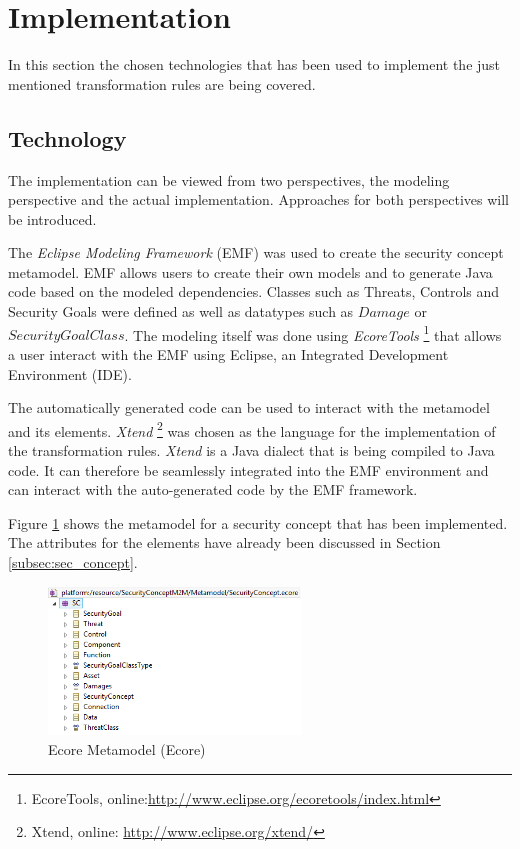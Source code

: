\section{Implementation}
\label{sec:implementation}

In this section the chosen technologies that has been used to implement the just mentioned transformation rules are being covered. 

\subsection{Technology}

The implementation can be viewed from two perspectives, the modeling perspective and the actual implementation. Approaches for both perspectives will be introduced.

The \textit{Eclipse Modeling Framework} (EMF) was used to create the security concept metamodel. EMF allows users to create their own models and to generate Java code based on the modeled dependencies. Classes such as Threats, Controls and Security Goals were defined as well as datatypes such as $Damage$ or $SecurityGoalClass$. The modeling itself was done using \textit{EcoreTools} \footnote{EcoreTools, online:\url{http://www.eclipse.org/ecoretools/index.html} } that allows a user interact with the EMF using Eclipse, an Integrated Development Environment (IDE).

The automatically generated code can be used to interact with the metamodel and its elements. \textit{Xtend} \footnote{Xtend, online: \url{http://www.eclipse.org/xtend/}} was chosen as the language for the implementation of the transformation rules. \textit{Xtend} is a Java dialect that is being compiled to Java code. It can therefore be seamlessly integrated into the EMF environment and can interact with the auto-generated code by the EMF framework.    

Figure \ref{fig:ecore_meta} shows the metamodel for a security concept that has been implemented. The attributes for the elements have already been discussed in Section \ref{subsec:sec_concept}.

\begin{figure}[H]
\centering
\includegraphics[width=0.6\textwidth]{pictures/ecore}
\caption{Ecore Metamodel (Ecore)}
\label{fig:ecore_meta}
\end{figure}

